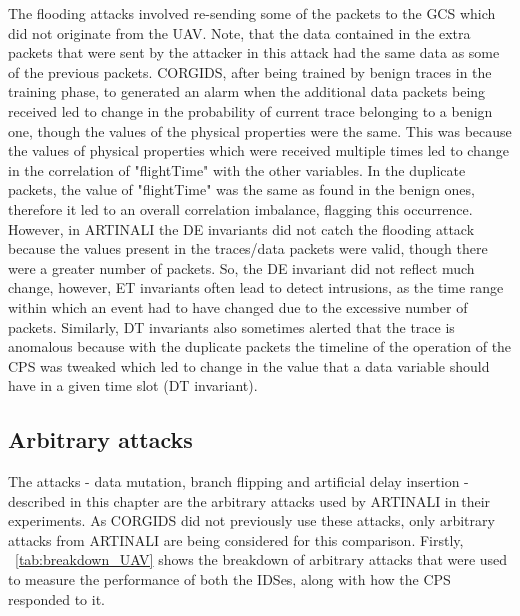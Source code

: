 The flooding attacks involved re-sending some of the packets to the \ac{GCS} which did not originate from the \ac{UAV}. Note, that the data contained in the extra packets that were sent by the attacker in this attack had the same data as some of the previous packets. \ac{CORGIDS}, after being trained by benign traces in the training phase, to generated an alarm when the additional data packets being received led to change in the probability of current trace belonging to a benign one, though the values of the physical properties were the same. This was because the values of physical properties which were received multiple times led to change in the correlation of "flightTime" with the other variables. In the duplicate packets, the value of "flightTime" was the same as found in the benign ones, therefore it led to an overall correlation imbalance, flagging this occurrence. However, in ARTINALI the D\textbar E invariants did not catch the flooding attack because the values present in the traces/data packets were valid, though there were a greater number of packets. So, the D\textbar E invariant did not reflect much change, however, E\textbar T invariants often lead to detect intrusions, as the time range within which an event had to have changed due to the excessive number of packets. Similarly, D\textbar T invariants also sometimes alerted that the trace is anomalous because with the duplicate packets the timeline of the operation of the \ac{CPS} was tweaked which led to change in the value that a data variable should have in a given time slot (D\textbar T invariant).

\subsection{Arbitrary attacks}
The attacks - data mutation, branch flipping and artificial delay insertion - described in this chapter are the arbitrary attacks used by ARTINALI in their experiments. As \ac{CORGIDS} did not previously use these attacks, only arbitrary attacks from ARTINALI are being considered for this comparison.
Firstly, ~\autoref{tab:breakdown_UAV} shows the breakdown of arbitrary attacks that were used to measure the performance of both the \ac{IDS}es, along with how the \ac{CPS} responded to it.

\begin{table}
\centering
  \caption{Breakdown of arbitrary attacks for \ac{UAV} platform}
  \label{tab:breakdown_UAV}
\end{table}

